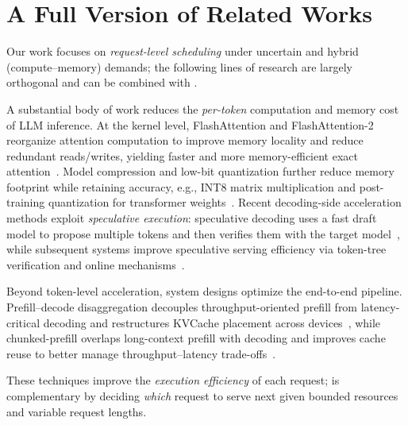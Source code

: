 \newpage
\appendix
\onecolumn

\section{A Full Version of Related Works}
Our work focuses on \emph{request-level scheduling} under uncertain and hybrid (compute--memory) demands; the following lines of research are largely orthogonal and can be combined with \oursched.

A substantial body of work reduces the \emph{per-token} computation and memory cost of LLM inference. At the kernel level, FlashAttention and FlashAttention-2 reorganize attention computation to improve memory locality and reduce redundant reads/writes, yielding faster and more memory-efficient exact attention~\cite{dao2022flashattention,dao2023flashattention}. Model compression and low-bit quantization further reduce memory footprint while retaining accuracy, e.g., INT8 matrix multiplication and post-training quantization for transformer weights~\cite{dettmers2022gpt3,frantar2022gptq}. Recent decoding-side acceleration methods exploit \emph{speculative execution}: speculative decoding uses a fast draft model to propose multiple tokens and then verifies them with the target model~\cite{leviathan2023speculative}, while subsequent systems improve speculative serving efficiency via token-tree verification and online mechanisms~\cite{miao2023specinfer,liu2023online}. 

Beyond token-level acceleration, system designs optimize the end-to-end pipeline. Prefill--decode disaggregation decouples throughput-oriented prefill from latency-critical decoding and restructures KVCache placement across devices~\cite{zhong2024distserve,qin2024mooncake,hu2024memserve,hu2024inference}, while chunked-prefill overlaps long-context prefill with decoding and improves cache reuse to better manage throughput--latency trade-offs~\cite{agrawal2024taming,hu2024inference}. 

These techniques improve the \emph{execution efficiency} of each request; \oursched is complementary by deciding \emph{which} request to serve next given bounded resources and variable request lengths.

